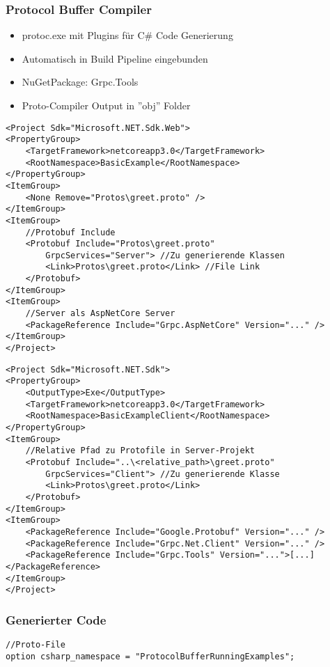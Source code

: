 \begin{multicols*}{2}
\subsubsection{Protocol Buffer Compiler}
\begin{itemize}
    \item protoc.exe mit Plugins für C\# Code Generierung
    \item Automatisch in Build Pipeline eingebunden
    \item NuGetPackage: Grpc.Tools
    \item Proto-Compiler Output in ''obj'' Folder
\end{itemize}
\begin{lstlisting}
<Project Sdk="Microsoft.NET.Sdk.Web"> 
<PropertyGroup>
    <TargetFramework>netcoreapp3.0</TargetFramework>
    <RootNamespace>BasicExample</RootNamespace> 
</PropertyGroup>
<ItemGroup>
    <None Remove="Protos\greet.proto" />
</ItemGroup>
<ItemGroup>
    //Protobuf Include
    <Protobuf Include="Protos\greet.proto" 
        GrpcServices="Server"> //Zu generierende Klassen
        <Link>Protos\greet.proto</Link> //File Link
    </Protobuf> 
</ItemGroup>
<ItemGroup>
    //Server als AspNetCore Server
    <PackageReference Include="Grpc.AspNetCore" Version="..." />
</ItemGroup>
</Project>
\end{lstlisting}
\begin{lstlisting}
<Project Sdk="Microsoft.NET.Sdk"> 
<PropertyGroup>
    <OutputType>Exe</OutputType> 
    <TargetFramework>netcoreapp3.0</TargetFramework> 
    <RootNamespace>BasicExampleClient</RootNamespace>
</PropertyGroup>
<ItemGroup>
    //Relative Pfad zu Protofile in Server-Projekt
    <Protobuf Include="..\<relative_path>\greet.proto"
        GrpcServices="Client"> //Zu generierende Klasse
        <Link>Protos\greet.proto</Link>
    </Protobuf>
</ItemGroup>
<ItemGroup>
    <PackageReference Include="Google.Protobuf" Version="..." /> 
    <PackageReference Include="Grpc.Net.Client" Version="..." /> 
    <PackageReference Include="Grpc.Tools" Version="...">[...] </PackageReference>
</ItemGroup>
</Project>
\end{lstlisting}
\subsubsection{Generierter Code}
\begin{lstlisting}
//Proto-File
option csharp_namespace = "ProtocolBufferRunningExamples"; 


\end{lstlisting}
\end{multicols*}
